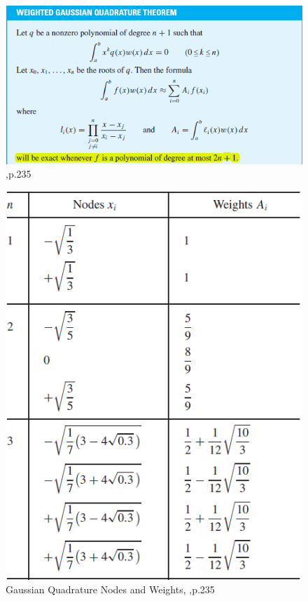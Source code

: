 \documentclass[12pt]{article}
\theoremstyle{theorem}
\begin{document}
\begin{figure}[h!]
	\centering
	\includegraphics[scale=1.0]{Figures/47}
	\caption{\cite{CheK07},p.235}
	\label{fig:47}
\end{figure}

\cleardoublepage

\begin{figure}[h!]
	\centering
	\includegraphics[scale=0.8]{Figures/48}
	\caption{Gaussian Quadrature Nodes and Weights, \cite{CheK07},p.235}
	\label{fig:48}
\end{figure}
\end{document}
